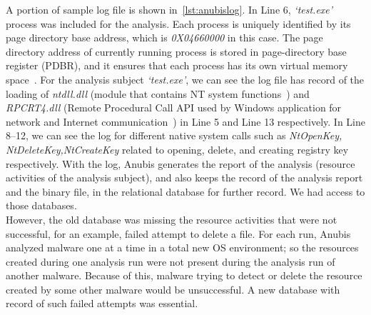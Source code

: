 A portion of sample log file is shown in~\autoref{lst:anubislog}.
In Line 6, \emph{`test.exe'} process was included for the analysis.
Each process is uniquely identified by its page directory base address, which is \emph{0X04660000} in this case. %
The page directory address of currently running process is stored in page-directory base register (PDBR), and it ensures that each process has its own virtual memory space~\cite[]{ttanalyze}.
For the analysis subject \emph{`test.exe'}, we can see the log file has record of the loading of \emph{ntdll.dll} (module that contains NT system functions~\cite[]{ntdll}) and \emph{RPCRT4.dll} (Remote Procedural Call API used by Windows application for network and Internet communication~\cite[]{rpcrt}) in Line 5 and Line 13 respectively.
In Line 8--12, we can see the log for different native system calls such as \emph{NtOpenKey, NtDeleteKey,NtCreateKey} related to opening, delete, and creating registry key respectively.
With the log, Anubis generates the report of the analysis (resource activities of the analysis subject), and also keeps the record of the analysis report and the binary file, in the relational database for further record.
We had access to those databases.\\

However, the old database was missing the resource activities that were not successful, for an example, failed attempt to delete a file.
For each run, Anubis analyzed malware one at a time in a total new OS environment; so the resources created during one analysis run were not present during the analysis run of another malware.
Because of this, malware trying to detect or delete the resource created by some other malware would be unsuccessful.
A new database with record of such failed attempts was essential.\\

